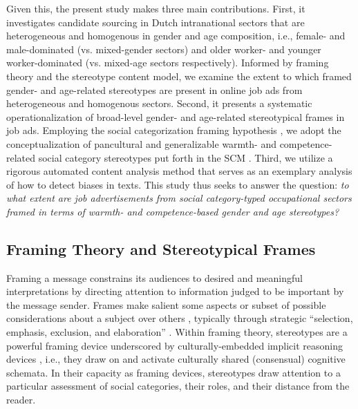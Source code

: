\documentclass[man]{apa7}
\begin{document}
Given this, the present study makes three main contributions. First, it investigates candidate sourcing in Dutch intranational sectors that are heterogeneous and homogenous in gender and age composition, i.e., female- and male-dominated (vs. mixed-gender sectors) and older worker- and younger worker-dominated (vs. mixed-age sectors respectively). Informed by framing theory and the stereotype content model, we examine the extent to which framed gender- and age-related stereotypes are present in online job ads from heterogeneous and homogenous sectors. Second, it presents a systematic operationalization of broad-level gender- and age-related stereotypical frames in job ads. Employing the social categorization framing hypothesis \parencite{Yang2015a}, we adopt the conceptualization of pancultural and generalizable warmth- and competence-related social category stereotypes put forth in the SCM \parencite{fiske_model_2002}. Third, we utilize a rigorous automated content analysis method that serves as an exemplary analysis of how to detect biases in texts. This study thus seeks to answer the question: \textit{to what extent are job advertisements from social category-typed occupational sectors framed in terms of warmth- and competence-based gender and age stereotypes?}

\subsection{Framing Theory and Stereotypical Frames}
\label{framing}
Framing a message constrains its audiences to desired and meaningful interpretations by directing attention to information judged to be important by the message sender. Frames make salient some aspects or subset of possible considerations about a subject over others \parencite{entman_framing_1993}, typically through strategic “selection, emphasis, exclusion, and elaboration” \parencite[p. 10] {reese_framing_2001}. Within framing theory, stereotypes are a powerful framing device underscored by culturally-embedded implicit reasoning devices \parencite{van_gorp_where_2005}, i.e., they draw on and activate culturally shared (consensual) cognitive schemata. In their capacity as framing devices, stereotypes draw attention to a particular assessment of social categories, their roles, and their distance from the reader.
\end{document}

